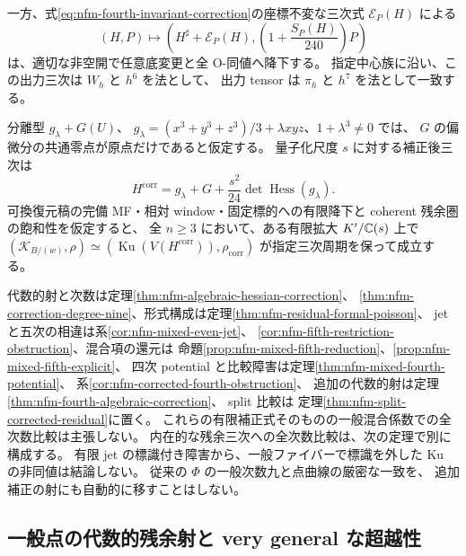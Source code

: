 \begin{maintheorem}[代数的補正と形式的な残余比較]
一方、式\eqref{eq:nfm-fourth-invariant-correction}の座標不変な三次式
$\mathcal E_P(H)$ による
\[
 (H,P)\longmapsto
 \left(H^\sharp+\mathcal E_P(H),
       \left(1+\frac{S_P(H)}{240}\right)P\right)
\]
は、適切な非空開で任意底変更と全 O-同値へ降下する。
指定中心族に沿い、この出力三次は $W_h$ と $h^6$ を法として、
出力 tensor は $\pi_h$ と $h^7$ を法として一致する。


分離型 $g_\lambda+G(U)$、
$g_\lambda=(x^3+y^3+z^3)/3+\lambda xyz$、$1+\lambda^3\ne0$ では、
$G$ の偏微分の共通零点が原点だけであると仮定する。
量子化尺度 $s$ に対する補正後三次は
\[
 H^{\mathrm{corr}}=g_\lambda+G+
               \frac{s^2}{24}\det\operatorname{Hess}(g_\lambda).
\]
可換復元稿の完備 MF・相対 window・固定標的への有限降下と
coherent 残余圏の飽和性を仮定すると、
全 $n\ge3$ において、ある有限拡大 $K'/\mathbb C(s)$ 上で
$(\mathcal K_{B/(w)},\rho)\simeq
(\operatorname{Ku}(V(H^{\mathrm{corr}})),\rho_{\mathrm{corr}})$
が指定三次周期を保って成立する。
\end{maintheorem}

代数的射と次数は定理\ref{thm:nfm-algebraic-hessian-correction}、
\ref{thm:nfm-correction-degree-nine}、形式構成は定理\ref{thm:nfm-residual-formal-poisson}、
jet と五次の相違は系\ref{cor:nfm-mixed-even-jet}、
\ref{cor:nfm-fifth-restriction-obstruction}、混合項の還元は
命題\ref{prop:nfm-mixed-fifth-reduction}、\ref{prop:nfm-mixed-fifth-explicit}、
四次 potential と比較障害は定理\ref{thm:nfm-mixed-fourth-potential}、
系\ref{cor:nfm-corrected-fourth-obstruction}、
追加の代数的射は定理\ref{thm:nfm-fourth-algebraic-correction}、
split 比較は
定理\ref{thm:nfm-split-corrected-residual}に置く。
これらの有限補正式そのものの一般混合係数での全次数比較は主張しない。
内在的な残余三次への全次数比較は、次の定理で別に構成する。
有限 jet の標識付き障害から、一般ファイバーで標識を外した Ku の非同値は結論しない。
従来の $\Phi$ の一般次数九と点曲線の厳密な一致を、
追加補正の射にも自動的に移すことはしない。

\subsection{一般点の代数的残余射と very general な超越性}

